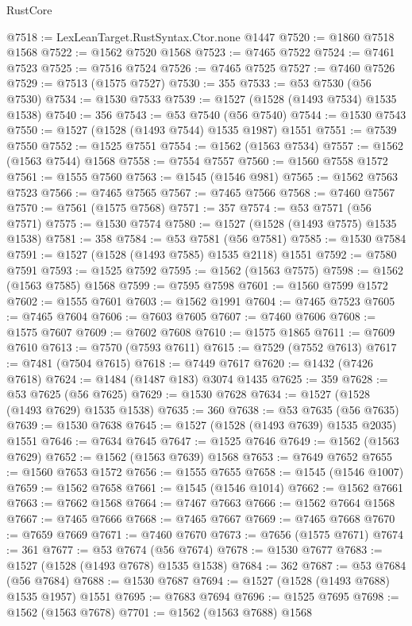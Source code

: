 \begin{lexlean}{RustCore}
\begin{coremodule}
@7518 := LexLeanTarget.RustSyntax.Ctor.none @1447
@7520 := @1860 @7518 @1568
@7522 := @1562 @7520 @1568
@7523 := @7465 @7522
@7524 := @7461 @7523
@7525 := @7516 @7524
@7526 := @7465 @7525
@7527 := @7460 @7526
@7529 := @7513 (@1575 @7527)
@7530 := 355
@7533 := @53 @7530 (@56 @7530)
@7534 := @1530 @7533
@7539 := @1527 (@1528 (@1493 @7534) @1535 @1538)
@7540 := 356
@7543 := @53 @7540 (@56 @7540)
@7544 := @1530 @7543
@7550 := @1527 (@1528 (@1493 @7544) @1535 @1987) @1551
@7551 := @7539 @7550
@7552 := @1525 @7551
@7554 := @1562 (@1563 @7534)
@7557 := @1562 (@1563 @7544) @1568
@7558 := @7554 @7557
@7560 := @1560 @7558 @1572
@7561 := @1555 @7560
@7563 := @1545 (@1546 @981)
@7565 := @1562 @7563 @7523
@7566 := @7465 @7565
@7567 := @7465 @7566
@7568 := @7460 @7567
@7570 := @7561 (@1575 @7568)
@7571 := 357
@7574 := @53 @7571 (@56 @7571)
@7575 := @1530 @7574
@7580 := @1527 (@1528 (@1493 @7575) @1535 @1538)
@7581 := 358
@7584 := @53 @7581 (@56 @7581)
@7585 := @1530 @7584
@7591 := @1527 (@1528 (@1493 @7585) @1535 @2118) @1551
@7592 := @7580 @7591
@7593 := @1525 @7592
@7595 := @1562 (@1563 @7575)
@7598 := @1562 (@1563 @7585) @1568
@7599 := @7595 @7598
@7601 := @1560 @7599 @1572
@7602 := @1555 @7601
@7603 := @1562 @1991
@7604 := @7465 @7523
@7605 := @7465 @7604
@7606 := @7603 @7605
@7607 := @7460 @7606
@7608 := @1575 @7607
@7609 := @7602 @7608
@7610 := @1575 @1865
@7611 := @7609 @7610
@7613 := @7570 (@7593 @7611)
@7615 := @7529 (@7552 @7613)
@7617 := @7481 (@7504 @7615)
@7618 := @7449 @7617
@7620 := @1432 (@7426 @7618)
@7624 := @1484 (@1487 @183) @3074 @1435
@7625 := 359
@7628 := @53 @7625 (@56 @7625)
@7629 := @1530 @7628
@7634 := @1527 (@1528 (@1493 @7629) @1535 @1538)
@7635 := 360
@7638 := @53 @7635 (@56 @7635)
@7639 := @1530 @7638
@7645 := @1527 (@1528 (@1493 @7639) @1535 @2035) @1551
@7646 := @7634 @7645
@7647 := @1525 @7646
@7649 := @1562 (@1563 @7629)
@7652 := @1562 (@1563 @7639) @1568
@7653 := @7649 @7652
@7655 := @1560 @7653 @1572
@7656 := @1555 @7655
@7658 := @1545 (@1546 @1007)
@7659 := @1562 @7658
@7661 := @1545 (@1546 @1014)
@7662 := @1562 @7661
@7663 := @7662 @1568
@7664 := @7467 @7663
@7666 := @1562 @7664 @1568
@7667 := @7465 @7666
@7668 := @7465 @7667
@7669 := @7465 @7668
@7670 := @7659 @7669
@7671 := @7460 @7670
@7673 := @7656 (@1575 @7671)
@7674 := 361
@7677 := @53 @7674 (@56 @7674)
@7678 := @1530 @7677
@7683 := @1527 (@1528 (@1493 @7678) @1535 @1538)
@7684 := 362
@7687 := @53 @7684 (@56 @7684)
@7688 := @1530 @7687
@7694 := @1527 (@1528 (@1493 @7688) @1535 @1957) @1551
@7695 := @7683 @7694
@7696 := @1525 @7695
@7698 := @1562 (@1563 @7678)
@7701 := @1562 (@1563 @7688) @1568

\end{coremodule}
\end{lexlean}
